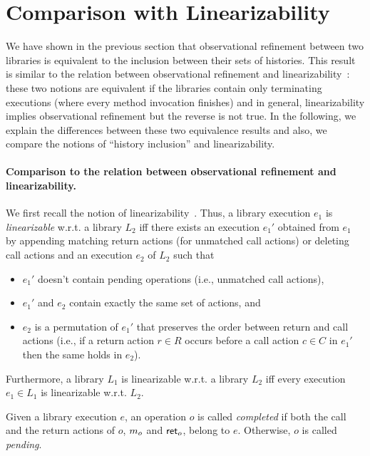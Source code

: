 \section{Comparison with Linearizability}
\label{sec:lin}


We have shown in the previous section that observational refinement between two libraries is 
equivalent to the inclusion between their sets of histories. This result is
similar to the relation between observational refinement and 
linearizability~\cite{journals/tcs/FilipovicORY10}: these two notions are equivalent if the libraries
contain only terminating executions (where every method invocation finishes) and in general,
linearizability implies observational refinement but the reverse is not true.
In the following, we explain the differences between these two equivalence results and also, we compare
the notions of ``history inclusion'' and linearizability.

\paragraph{Comparison to the relation between observational refinement and linearizability.}
We first recall the notion of
linearizability~\cite{journals/toplas/HerlihyW90}. Thus, a library execution $e_1$ is \emph{linearizable} w.r.t. a
library $L_2$ iff there exists an execution $e_1'$ obtained from $e_1$ by
appending matching return actions (for unmatched call actions) or deleting call actions
and an execution $e_2$ of $L_2$ such that 
\begin{itemize}
	\item $e_1'$ doesn't contain pending operations 
(i.e., unmatched call actions), 
	\item $e_1'$ and $e_2$ contain exactly the same set of actions, and 
	\item $e_2$ is a permutation of $e_1'$ that preserves the order between return and call
actions (i.e., if a return action $r\in R$ occurs before a call action $c\in C$
in $e_1'$ then the same holds in $e_2$). 
\end{itemize}
Furthermore, a library $L_1$ is linearizable
w.r.t. a library $L_2$ iff every execution $e_1\in L_1$ is linearizable w.r.t.
$L_2$. %

Given a library execution $e$, an operation $o$ is called \emph{completed} if
both the call and the return actions of $o$, ${m_{o}}$ and ${\mathsf{ret}_{o}}$,
belong to $e$. Otherwise, $o$ is called \emph{pending}.

